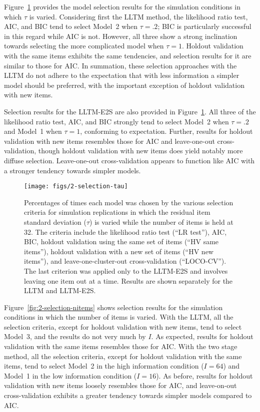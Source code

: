 Figure~\ref{fig:2-selection-tau} provides the model selection results for the simulation conditions in which $\tau$ is varied. Considering first the LLTM method, the likelihood ratio test, AIC, and BIC tend to select Model~2 when $\tau = .2$; BIC is particularly successful in this regard while AIC is not. However, all three show a strong inclination towards selecting the more complicated model when $\tau = 1$. Holdout validation with the same items exhibits the same tendencies, and selection results for it are similar to those for AIC. In summation, these selection approaches with the LLTM do not adhere to the expectation that with less information a simpler model should be preferred, with the important exception of holdout validation with new items.

Selection results for the LLTM-E2S are also provided in Figure~\ref{fig:2-selection-tau}. All three of the likelihood ratio test, AIC, and BIC strongly tend to select Model~2 when $\tau = .2$ and Model~1 when $\tau = 1$, conforming to expectation. Further, results for holdout validation with new items resembles those for AIC and leave-one-out cross-validation, though holdout validation with new items does yield notably more diffuse selection. Leave-one-out cross-validation appears to function like AIC with a stronger tendency towards simpler models.

\begin{figure}
	\centering
	\texttt{[image: figs/2-selection-tau]}
	\caption{Percentages of times each model was chosen by the various selection criteria for simulation replications in which the residual item standard deviation ($\tau$) is varied while the number of items is held at 32. The criteria include the likelihood ratio test (``LR test''), AIC, BIC, holdout validation using the same set of items (``HV same items''), holdout validation with a new set of items (``HV new items''), and leave-one-cluster-out cross-validation (``LOCO-CV''). The last criterion was applied only to the LLTM-E2S and involves leaving one item out at a time. Results are shown separately for the LLTM and LLTM-E2S.}	
	\label{fig:2-selection-tau}
\end{figure}

Figure~\ref{fig:2-selection-nitems} shows selection results for the simulation conditions in which the number of items is varied. With the LLTM, all the selection criteria, except for holdout validation with new items, tend to select Model~3, and the results do not very much by $I$. As expected, results for holdout validation with the same items resembles those for AIC. With the two stage method, all the selection criteria, except for holdout validation with the same items, tend to select Model~2 in the high information condition ($I=64$) and Model~1 in the low information condition ($I=16$). As before, results for holdout validation with new items loosely resembles those for AIC, and leave-on-out cross-validation exhibits a greater tendency towards simpler models compared to AIC.

